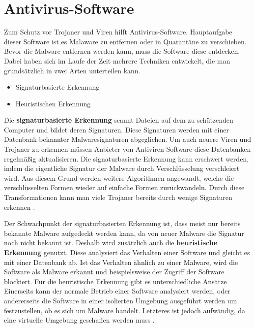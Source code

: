 \section{Antivirus-Software}\label{sec:antivirus}
Zum Schutz vor Trojaner und Viren hilft Antivirus-Software.
Hauptaufgabe dieser Software ist es Malaware zu entfernen oder in Quarantäne zu verschieben.
Bevor die Malware entfernen werden kann, muss die Software diese entdecken.
Dabei haben sich im Laufe der Zeit mehrere Techniken entwickelt, die man grundsätzlich 
in zwei Arten unterteilen kann.\cite{ANTNE1}
\begin{itemize}
    \item Signaturbasierte Erkennung
    \item Heuristischen Erkennung
\end{itemize}
Die \textbf{signaturbasierte Erkennung} scannt Dateien auf dem zu schützenden Computer 
und bildet deren Signaturen. 
Diese Signaturen werden mit einer Datenbank bekannter Malwaresignaturen abgeglichen.
Um auch neuere Viren und Trojaner zu erkennen müssen Anbieter von Antiviren Software diese Datenbanken regelmäßig aktualisieren.
Die signaturbasierte Erkennung kann erschwert werden, indem die eigentliche Signatur der Malware durch Verschlüsselung verschleiert wird.
Aus diesem Grund werden weitere Algorithmen angewandt, welche die verschlüsselten Formen wieder auf einfache Formen zurückwandeln.
Durch diese Transformationen kann man viele Trojaner bereits durch wenige Signaturen erkennen \cite{ANTNE2}.

Der Schwachpunkt der signaturbasierten Erkennung ist, dass meist nur bereits bekannte Malware aufgedeckt werden kann,
da von neuer Malware die Signatur noch nicht bekannt ist.
Deshalb wird zusätzlich auch die \textbf{heuristische Erkennung} genutzt. 
Diese analysiert das Verhalten einer Software und gleicht es mit einer Datenbank ab.
Ist das Verhalten ähnlich zu einer Malware, wird die Software als Malware erkannt und beispielsweise der Zugriff der Software blockiert.
Für die heuristische Erkennung gibt es unterschiedliche Ansätze
Einerseits kann der normale Betrieb einer Software analysiert werden,
oder andererseits die Software in einer isolierten Umgebung ausgeführt werden um festzustellen,
ob es sich um Malware handelt. 
Letzteres ist jedoch aufwändig, da eine virtuelle Umgebung geschaffen werden muss \cite{ANTNE3}.


